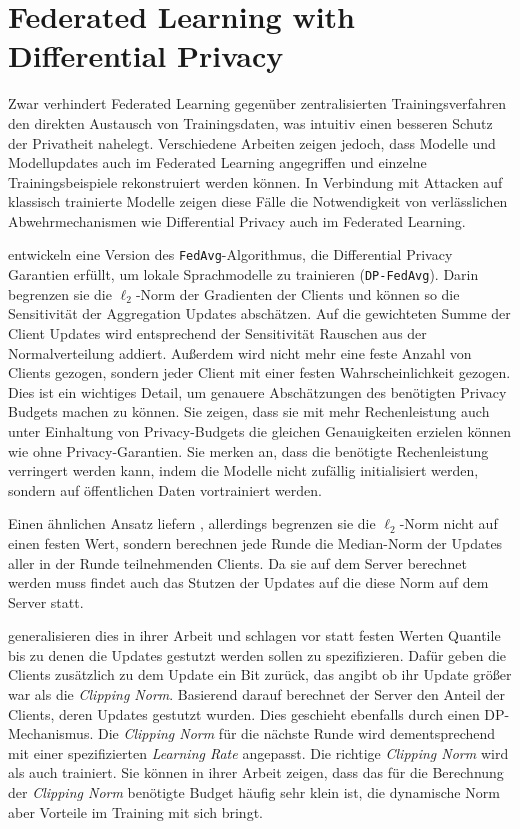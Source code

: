 \section{Federated Learning with Differential Privacy}
Zwar verhindert Federated Learning gegenüber zentralisierten Trainingsverfahren den direkten Austausch von Trainingsdaten, was intuitiv einen besseren Schutz der Privatheit nahelegt. Verschiedene Arbeiten \cite{wang:2019, geiping:2020} zeigen jedoch, dass Modelle und Modellupdates auch im Federated Learning angegriffen und einzelne Trainingsbeispiele rekonstruiert werden können. In Verbindung mit Attacken auf klassisch trainierte Modelle zeigen diese Fälle die Notwendigkeit von verlässlichen Abwehrmechanismen wie Differential Privacy auch im Federated Learning.

\textcite{mcmahan:2018} entwickeln eine Version des \texttt{FedAvg}-Algorithmus, die Differential Privacy Garantien erfüllt, um lokale Sprachmodelle zu trainieren (\texttt{DP-FedAvg}). Darin begrenzen sie die $\ell_2$-Norm der Gradienten der Clients und können so die Sensitivität der Aggregation Updates abschätzen. Auf die gewichteten Summe der Client Updates wird entsprechend der Sensitivität Rauschen aus der Normalverteilung addiert. Außerdem wird nicht mehr eine feste Anzahl von Clients gezogen, sondern jeder Client mit einer festen Wahrscheinlichkeit gezogen. Dies ist ein wichtiges Detail, um genauere Abschätzungen des benötigten Privacy Budgets machen zu können\cite{wang:2020}. Sie zeigen, dass sie mit mehr Rechenleistung auch unter Einhaltung von Privacy-Budgets die gleichen Genauigkeiten erzielen können wie ohne Privacy-Garantien. Sie merken an, dass die benötigte Rechenleistung verringert werden kann, indem die Modelle nicht zufällig initialisiert werden, sondern auf öffentlichen Daten vortrainiert werden.

Einen ähnlichen Ansatz liefern \textcite{geyer:2017}, allerdings begrenzen sie die $\ell_2$-Norm nicht auf einen festen Wert, sondern berechnen jede Runde die Median-Norm der Updates aller in der Runde teilnehmenden Clients. Da sie auf dem Server berechnet werden muss findet auch das Stutzen der Updates auf die diese Norm auf dem Server statt. 

\textcite{andrew:2021} generalisieren dies in ihrer Arbeit und schlagen vor statt festen Werten Quantile bis zu denen die Updates gestutzt werden sollen zu spezifizieren. Dafür geben die Clients zusätzlich zu dem Update ein Bit zurück, das angibt ob ihr Update größer war als die \textit{Clipping Norm}. Basierend darauf berechnet der Server den Anteil der Clients, deren Updates gestutzt wurden. Dies geschieht ebenfalls durch einen DP-Mechanismus. Die \textit{Clipping Norm} für die nächste Runde wird dementsprechend mit einer spezifizierten \textit{Learning Rate} angepasst. Die richtige \textit{Clipping Norm} wird als auch trainiert. Sie können in ihrer Arbeit zeigen, dass das für die Berechnung der \textit{Clipping Norm} benötigte Budget häufig sehr klein ist, die dynamische Norm aber Vorteile im Training mit sich bringt.

